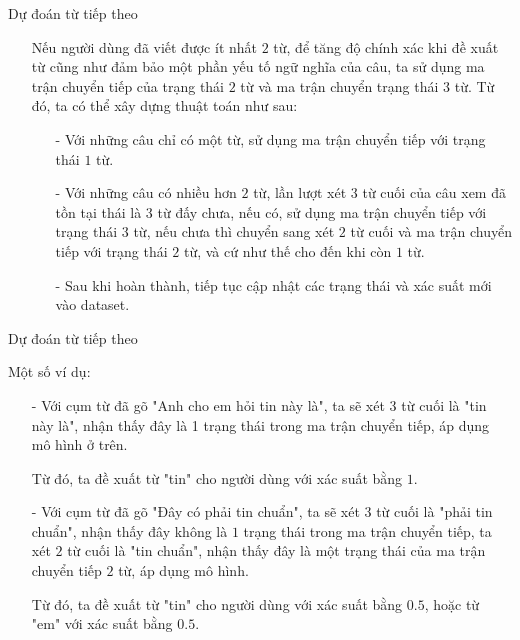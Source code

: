 \begin{frame}{Dự đoán từ tiếp theo}

\begin{itemize}
     \item[\bullet] Nếu người dùng đã viết được ít nhất $2$ từ, để tăng độ chính xác khi đề xuất từ cũng như đảm bảo một phần yếu tố ngữ nghĩa của câu, ta sử dụng ma trận chuyển tiếp của trạng thái $2$ từ và ma trận chuyển trạng thái $3$ từ. Từ đó, ta có thể xây dựng thuật toán như sau:

    \begin{itemize}
        \item[-] Với những câu chỉ có một từ, sử dụng ma trận chuyển tiếp với trạng thái $1$ từ.
        \item[-]  Với những câu có nhiều hơn $2$ từ, lần lượt xét $3$ từ cuối của câu xem đã tồn tại thái là $3$ từ đấy chưa, nếu có, sử dụng ma trận chuyển tiếp với trạng thái $3$ từ, nếu chưa thì chuyển sang xét $2$ từ cuối và ma trận chuyển tiếp với trạng thái $2$ từ, và cứ như thế cho đến khi còn $1$ từ.
        \item[-] Sau khi hoàn thành, tiếp tục cập nhật các trạng thái và xác suất mới vào dataset.
    \end{itemize}     

\end{itemize}
\end{frame}

\begin{frame}{Dự đoán từ tiếp theo}
    \item[\bullet] Một số ví dụ:
    \begin{itemize}
        \item[-] Với cụm từ đã gõ "Anh cho em hỏi tin này là", ta sẽ xét 3 từ cuối là "tin này là", nhận thấy đây là 1 trạng thái trong ma trận chuyển tiếp, áp dụng mô hình ở trên.
        \item[\rightarrow] Từ đó, ta đề xuất từ "tin" \space cho người dùng với xác suất bằng $1$.        
        \item[-] Với cụm từ đã gõ "Đây có phải tin chuẩn", ta sẽ xét $3$ từ cuối là "phải tin chuẩn", nhận thấy đây không là $1$ trạng thái trong ma trận chuyển tiếp, ta xét $2$ từ cuối là "tin chuẩn", nhận thấy đây là một trạng thái của ma trận chuyển tiếp $2$ từ, áp dụng mô hình.
        \item[\rightarrow] Từ đó, ta đề xuất từ "tin" \space cho người dùng với xác suất bằng $0.5$, hoặc từ "em" \space với xác suất bằng $0.5$.   
    \end{itemize}
\end{frame}
